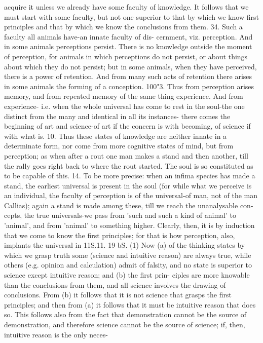 {{{{{{{{{{{{{{{{{{{{{{{{{{{{{{{{{{{{{{{{{{{{{{{{{{{{{{{{{{{{{{{{{{{{{{{{{{acquire it unless we already have some faculty of knowledge. It
follows that we must start with some faculty, but not one
superior to that by which we know first principles and that by
which we know the conclusions from them.
34. Such a faculty all animals have-an innate faculty of dis-
cernment, viz. perception. And in some animals perceptions
persist. There is no knowledge outside the moment of perception,
for animals in which perceptions do not persist, or about things
about which they do not persist; but in some animals, when they
have perceived, there is a power of retention. And from many
such acts of retention there arises in some animals the forming of
a conception.
100"3. Thus from perception arises memory, and from repeated
memory of the same thing experience. And from experience-
i.e. when the whole universal has come to rest in the soul-the
one distinct from the many and identical in all its instances-
there comes the beginning of art and science-of art if the
concern is with becoming, of science if with what is.
10. Thus these states of knowledge are neither innate in a
determinate form, nor come from more cognitive states of mind,
but from perception; as when after a rout one man makes a
stand and then another, till the rally goes right back to where
the rout started. The soul is so constituted as to be capable of
this.
14. To be more precise: when an infima species has made
a stand, the earliest universal is present in the soul (for while
what we perceive is an individual, the faculty of perception
is of the universal-of man, not of the man Callias); again a
stand is made among these, till we reach the unanalysable con-
cepts, the true universals-we pass from 'such and such a kind
of animal' to 'animal', and from 'animal' to something higher.
Clearly, then, it is by induction that we come to know the first
principles; for that is how perception, also, implants the universal
in
11S.11. 19
bS. (1) Now (a) of the thinking states by which we grasp truth
some (science and intuitive reason) are always true, while others
(e.g. opinion and calculation) admit of falsity, and no state is
superior to science except intuitive reason; and (b) the first prin-
ciples are more knowable than the conclusions from them, and
all science involves the drawing of conclusions. From (b) it
follows that it is not science that grasps the first principles; and
then from (a) it follows that it must be intuitive reason that does
so. This follows also from the fact that demonstration cannot be
the source of demonstration, and therefore science cannot be
the source of science; if, then, intuitive reason is the only neces-
}}}}}}}}}}}}}}}}}}}}}}}}}}}}}}}}}}}}}}}}}}}}}}}}}}}}}}}}}}}}}}}}}}}}}}}}}}
